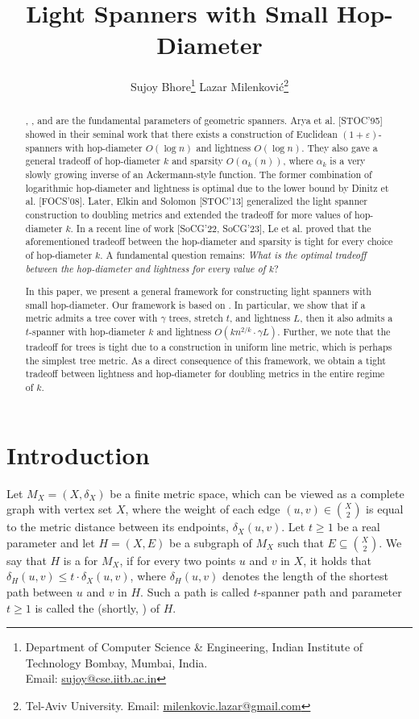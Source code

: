 \documentclass[11pt,english]{article}
\title{Light Spanners with Small Hop-Diameter}
\date{}
\author{Sujoy Bhore\thanks{Department of Computer Science \& Engineering, Indian Institute of Technology Bombay, Mumbai, India.\\ Email: \href{sujoy@cse.iitb.ac.in}{sujoy@cse.iitb.ac.in}}
 \quad
 Lazar Milenkovi\'{c}\thanks{Tel-Aviv University. Email: \href{milenkovic.lazar@gmail.com}{milenkovic.lazar@gmail.com}}}
\renewcommand{\emph}[1]{{\color{MyGreen}{\em #1}}}
\begin{document}
\maketitle


\begin{abstract}
\emph{Lightness}, \emph{sparsity}, and \emph{hop-diameter} are the fundamental parameters of geometric spanners. Arya et al. [STOC'95] showed in their seminal work that there exists a construction of Euclidean $(1+\varepsilon)$-spanners with hop-diameter $O(\log n)$ and lightness $O(\log n)$. They also gave a general tradeoff of hop-diameter $k$ and sparsity $O(\alpha_k(n))$, where $\alpha_k$ is a very slowly growing inverse of an Ackermann-style function. The former combination of logarithmic hop-diameter and lightness is optimal due to the lower bound by Dinitz et al. [FOCS'08]. Later, Elkin and Solomon [STOC'13] generalized the light spanner construction to doubling metrics and extended the tradeoff for more values of hop-diameter $k$. In a recent line of work [SoCG'22, SoCG'23], Le et al. proved that the aforementioned tradeoff between the hop-diameter and sparsity is tight for every choice of hop-diameter $k$. A fundamental question remains: \textit{What is the optimal tradeoff between the hop-diameter and lightness for every value of $k$}?

In this paper, we present a general framework for constructing light spanners with small hop-diameter. Our framework is based on \emph{tree covers}. In particular, we show that if a metric admits a tree cover with $\gamma$ trees, stretch $t$, and lightness $L$, then it also admits a $t$-spanner with hop-diameter $k$ and lightness $O(kn^{2/k}\cdot \gamma L)$. Further, we note that the tradeoff for trees is tight due to a construction in uniform line metric, which is perhaps the simplest tree metric. As a direct consequence of this framework, we obtain a tight tradeoff between lightness and hop-diameter for doubling metrics in the entire regime of $k$.
\end{abstract}



\section{Introduction}
Let $M_X = (X, \delta_X)$ be a finite metric space, which can be viewed as a complete graph with vertex set $X$, where the weight of each edge $(u,v) \in \binom{X}{2}$ is equal to the metric distance between its endpoints, $\delta_X(u,v)$. Let $t \ge 1$ be a real parameter and let $H = (X,E)$ be a subgraph of $M_X$ such that $E \subseteq \binom{X}{2}$.
We say that $H$ is a \emph{$t$-spanner} for $M_X$, if for every two points $u$ and $v$ in $X$, it holds that $\delta_H(u,v) \le t \cdot \delta_X(u,v)$, where $\delta_H(u,v)$ denotes the length of the shortest path between $u$ and $v$ in $H$. Such a path is called $t$-spanner path and parameter $t\ge 1$ is called the \emph{stretch factor} (shortly, \emph{stretch}) of $H$.
\end{document}
